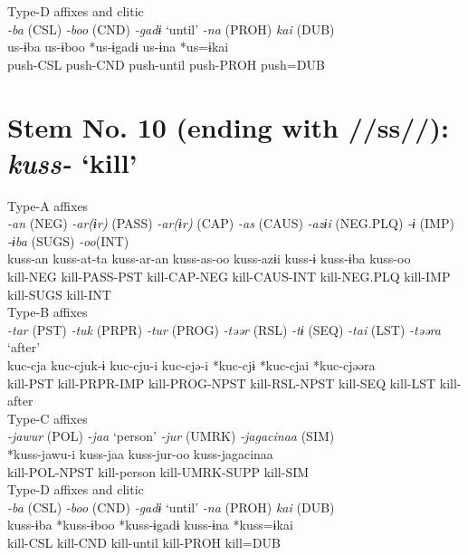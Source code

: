 \ex Type-D affixes and clitic\\
\glll \textit{-ba} (CSL)  \textit{-boo} (CND)  \textit{-gadɨ} ‘until’  \textit{-na} (PROH)  \textit{kai} (DUB)\\
us-ɨba  us-ɨboo  *us-ɨgadɨ  us-ɨna  *us=ɨkai\\
push-CSL  push-CND  push-until  push-PROH  push=DUB\\
\z

\section{Stem No. 10 (ending with //ss//): \textit{kuss-} ‘kill’}

\ea Type-A affixes\\
\glll \textit{-an} (NEG)  \textit{-ar(ɨr)} (PASS)  \textit{-ar(ɨr)} (CAP)  \textit{-as} (CAUS)  \textit{-azɨi} (NEG.PLQ)  \textit{-ɨ} (IMP)  \textit{-ɨba} (SUGS)  \textit{-oo}(INT)\\
kuss-an  kuss-at-ta  kuss-ar-an  kuss-as-oo  kuss-azɨi  kuss-ɨ  kuss-ɨba  kuss-oo\\
kill-NEG  kill-PASS-PST  kill-CAP-NEG  kill-CAUS-INT  kill-NEG.PLQ  kill-IMP  kill-SUGS  kill-INT\\


\ex Type-B affixes\\
\glll \textit{-tar} (PST)  \textit{-tuk} (PRPR)  \textit{-tur} (PROG)  \textit{-təər} (RSL)  \textit{-tɨ} (SEQ)  \textit{-tai} (LST)  \textit{-təəra} ‘after’\\
kuc-cja  kuc-cjuk-ɨ  kuc-cju-i  kuc-cjə-i  *kuc-cjɨ  *kuc-cjai  *kuc-cjəəra\\
kill-PST  kill-PRPR-IMP  kill-PROG-NPST  kill-RSL-NPST  kill-SEQ  kill-LST  kill-after\\


\ex Type-C affixes\\
\glll \textit{-jawur} (POL)  \textit{-jaa} ‘person’  \textit{-jur} (UMRK)  \textit{-jagacinaa} (SIM)\\
*kuss-jawu-i  kuss-jaa  kuss-jur-oo  kuss-jagacinaa\\
kill-POL-NPST  kill-person  kill-UMRK-SUPP  kill-SIM\\


\ex Type-D affixes and clitic\\
\glll \textit{-ba} (CSL)  \textit{-boo} (CND)  \textit{-gadɨ} ‘until’  \textit{-na} (PROH)  \textit{kai} (DUB)\\
kuss-ɨba  *kuss-ɨboo  *kuss-ɨgadɨ  kuss-ɨna  *kuss=ɨkai\\
kill-CSL  kill-CND  kill-until  kill-PROH  kill=DUB\\
\z

